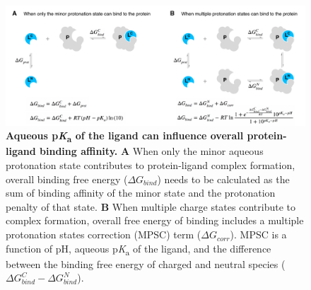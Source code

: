 \documentclass[9pt,lineno,final]{elife}
\newcommand{\pKa}{p\textit{K}\textsubscript{a}}
\begin{document}
\begin{figure}
\centering
\includegraphics[width=1.0\linewidth]{figures/pKa-effects-on-protein-ligand-binding.pdf}
\caption{ {\bf Aqueous \pKa{} of the ligand can influence overall protein-ligand binding affinity.} {\bf A} When only the minor aqueous protonation state contributes to protein-ligand complex formation, overall binding free energy ($\Delta G_{bind}$) needs to be calculated as the sum of binding affinity of the minor state and the protonation penalty of that state. {\bf B} When multiple charge states contribute to complex formation, overall free energy of binding includes a multiple protonation states correction (MPSC) term ($\Delta G_{corr}$). MPSC is a function of pH, aqueous \pKa{} of the ligand, and the difference between the binding free energy of charged and neutral species ($\Delta G_{bind}^{C} - \Delta G_{bind}^{N}$).
}
\label{fig:pKa-effects-on-protein-ligand-binding}
\end{figure}
\end{document}
